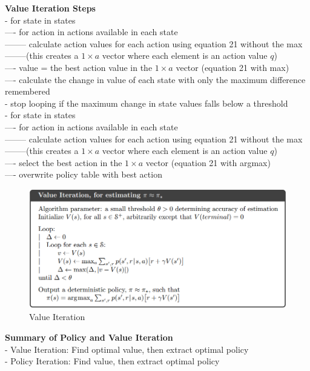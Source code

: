 \documentclass{article}
\begin{document}
\noindent
\textbf{Value Iteration Steps}\\
- for state in states \\
---- for action in actions available in each state \\
-------- calculate action values for each action using equation 21 without the
max\\
--------(this creates a $1 \times a$ vector where each element is an
action value $q$)\\
---- value = the best action value in the $ 1 \times a$ vector (equation 21 with
max)\\
---- calculate the change in value of each state with only the maximum
difference remembered\\
- stop looping if the maximum change in state values falls below a threshold\\
- for state in states\\
---- for action in actions available in each state \\
-------- calculate action values for each action using equation 21 without the
max\\
--------(this creates a $1 \times a$ vector where each element is an
action value $q$)\\
---- select the best action in the $ 1 \times a$ vector (equation 21 with
argmax)\\
---- overwrite policy table with best action

\begin{figure}[h]
\includegraphics[scale=0.35]{value_iteration}
\centering
\caption{Value Iteration}
\end{figure}

\noindent
\textbf{Summary of Policy and Value Iteration}\\
- Value Iteration: Find optimal value, then extract optimal policy\\
- Policy Iteration: Find value, then extract optimal policy\\
\end{document}
